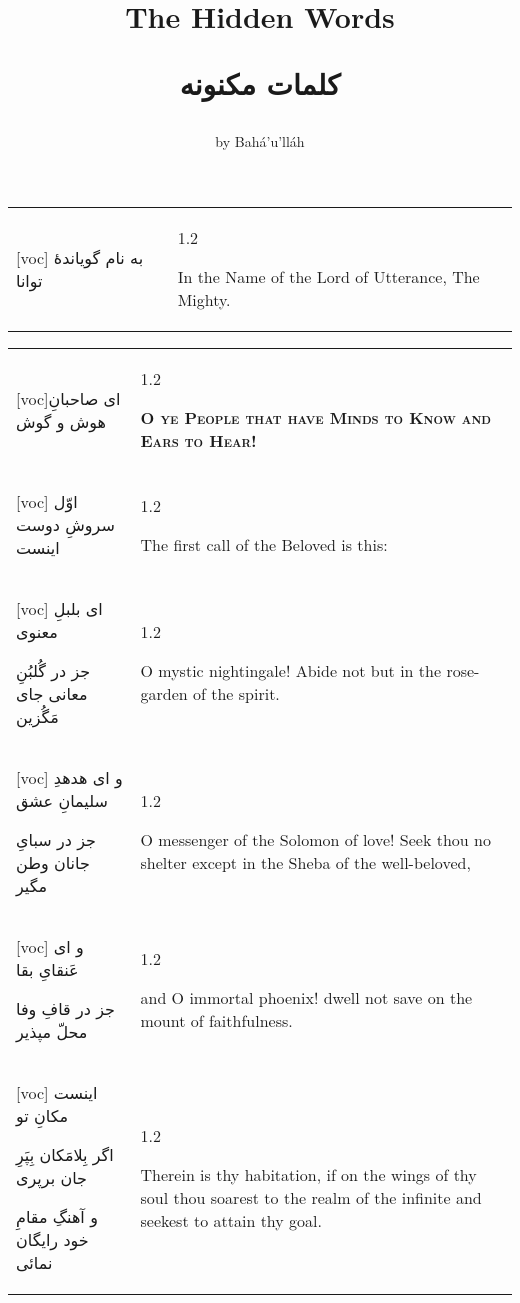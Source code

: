 \documentclass[11pt]{article}
\title{
\Huge
\vspace*{2in}
The Hidden Words \\
\vspace{.25in}
\fontsize{48}{36}
\begin{arab}
کلمات مکنونه
\end{arab}
\vspace{1in}}
\author{\LARGE by Bahá’u’lláh}
\date{}
\makeatletter
\newenvironment{orig}
  {\begin{farsi}[voc]}
  {\end{farsi}}
\newenvironment{trans}
  {\Large\begin{spacing}{1.2}\raggedright}
  {\end{spacing}}
\newenvironment{word}
  {\begin{tabular}[t]{p{2.75in}@{\hspace{3em}}p{2.75in}}}
  {\end{tabular}}
\newcommand{\ayat}[2]{\begin{orig}#1\end{orig} & \begin{trans}#2\end{trans}}
\newcommand{\heading}[2]{\textsc{\textbf{#1}} %
}
\makeatother
\begin{document}
\maketitle
\thispagestyle{empty}

\newpage

\fontsize{24}{32}

\vspace*{3in}

\begin{word}
\ayat{
به نام گویاندۀ توانا
}{
In the Name of the Lord of Utterance, The Mighty.
}
\end{word}

\pagebreak

\begin{word}
\ayat{ای صاحبانِ هوش و گوش}{\heading{
  O ye People that have Minds to Know and Ears to Hear!}{}} \\ \ayat{
اوّل سروشِ دوست اینست
}{The first call of the Beloved is this:} \\ \ayat{
ای بلبلِ معنوی

جز در گُلبُنِ معانی جای مَگُزين
}{O mystic nightingale! Abide not but in the rose-garden of the spirit.} \\ \ayat{
و ای هدهدِ سلیمانِ عشق

جز در سبایِ جانان وطن مگیر
}{O messenger of the Solomon of love! Seek thou no shelter except in the Sheba
  of the well-beloved,} \\ \ayat{
و ای عَنقایِ بقا

جز در قافِ وفا محلّ مپذیر
}{and O immortal phoenix! dwell not save on the mount of faithfulness.} \\ \ayat{
اینست مکانِ تو

اگر بِلامَکان بِپَرِ جان برپری

و آهنگِ مقامِ خود رایگان نمائی
}{Therein is thy habitation, if on the wings of thy soul thou soarest to the
  realm of the infinite and seekest to attain thy goal.}
\end{word}

\newpage
\end{document}
